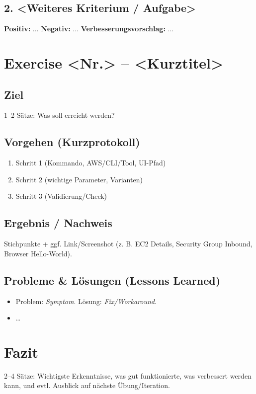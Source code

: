 \documentclass[a4paper,12pt]{article}
\newcommand{\pos}{\textbf{Positiv:} }
\newcommand{\negx}{\textbf{Negativ:} }
\newcommand{\impr}{\textbf{Verbesserungsvorschlag:} }
\begin{document}
\Needspace{0.5\textheight}
\subsection*{2. <Weiteres Kriterium / Aufgabe>}
\pos ...
\negx ...
\impr ...


\section*{Exercise <Nr.> – <Kurztitel>}
\subsection*{Ziel}
1–2 Sätze: Was soll erreicht werden?

\subsection*{Vorgehen (Kurzprotokoll)}
\begin{enumerate}
  \item Schritt 1 (Kommando, AWS/CLI/Tool, UI-Pfad)
  \item Schritt 2 (wichtige Parameter, Varianten)
  \item Schritt 3 (Validierung/Check)
\end{enumerate}

\subsection*{Ergebnis / Nachweis}
Stichpunkte + ggf. Link/Screenshot (z. B. EC2 Details, Security Group Inbound, Browser Hello-World).

\subsection*{Probleme \& Lösungen (Lessons Learned)}
\begin{itemize}
  \item Problem: \textit{Symptom}. Lösung: \textit{Fix/Workaround}.
  \item …
\end{itemize}

\section*{Fazit}
2–4 Sätze: Wichtigste Erkenntnisse, was gut funktionierte, was verbessert werden kann,
und evtl. Ausblick auf nächste Übung/Iteration.
\end{document}
